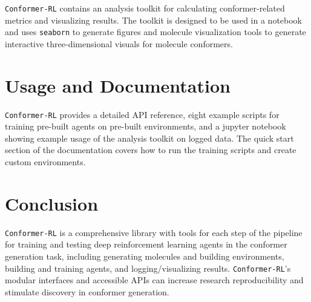 \documentclass[twoside,11pt]{article}
\newcommand{\code}[1]{\texttt{#1}}
\newcommand{\titleofpaper}{Conformer-RL}
\begin{document}
\code{\titleofpaper} contains an analysis toolkit for calculating conformer-related metrics and visualizing results. The toolkit is designed to be used in a notebook and uses \code{seaborn} \citep{waskom2021seaborn} to generate figures and molecule visualization tools to generate interactive three-dimensional visuals for molecule conformers.



\section{Usage and Documentation}
\code{\titleofpaper} provides a detailed API reference, eight example scripts for training pre-built agents on pre-built environments, and a jupyter notebook showing example usage of the analysis toolkit on logged data. The quick start section of the documentation covers how to run the training scripts and create custom environments.

\section{Conclusion}
\code{\titleofpaper} is a comprehensive library with tools for each step of the pipeline for training and testing deep reinforcement learning agents in the conformer generation task, including generating molecules and building environments, building and training agents, and logging/visualizing results. \code{\titleofpaper}'s modular interfaces and accessible APIs can increase research reproducibility and stimulate discovery in conformer generation.



\newpage


\vskip 0.2in




\newpage

\end{document}
